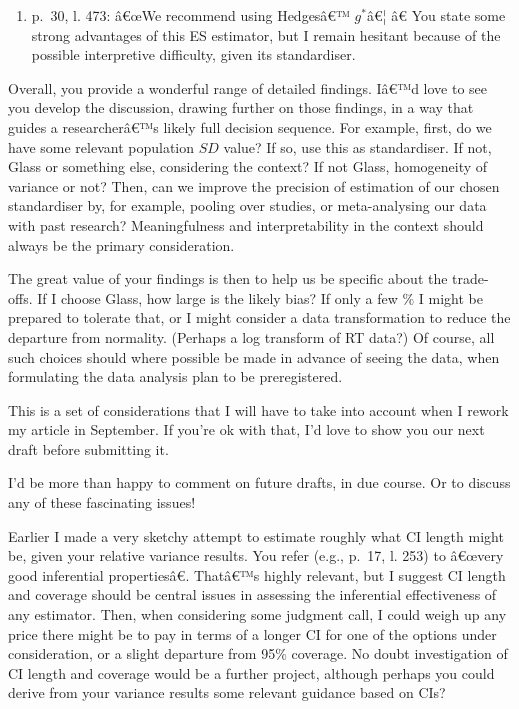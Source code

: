 \begin{appendix}
\color{black}

\begin{enumerate}
\def\labelenumi{\arabic{enumi}.}
\setcounter{enumi}{1}
\tightlist
\item
  p.~30, l. 473: â€œWe recommend using Hedgesâ€™ \(g^*\)â€¦ â€ You
  state some strong advantages of this ES estimator, but I remain
  hesitant because of the possible interpretive difficulty, given its
  standardiser.
\end{enumerate}

Overall, you provide a wonderful range of detailed findings. Iâ€™d love
to see you develop the discussion, drawing further on those findings, in
a way that guides a researcherâ€™s likely full decision sequence. For
example, first, do we have some relevant population \(SD\) value? If so,
use this as standardiser. If not, Glass or something else, considering
the context? If not Glass, homogeneity of variance or not? Then, can we
improve the precision of estimation of our chosen standardiser by, for
example, pooling over studies, or meta-analysing our data with past
research? Meaningfulness and interpretability in the context should
always be the primary consideration.

The great value of your findings is then to help us be specific about
the trade-offs. If I choose Glass, how large is the likely bias? If only
a few \(\%\) I might be prepared to tolerate that, or I might consider a
data transformation to reduce the departure from normality. (Perhaps a
log transform of RT data?) Of course, all such choices should where
possible be made in advance of seeing the data, when formulating the
data analysis plan to be preregistered.

\color{blue} This is a set of considerations that I will have to take
into account when I rework my article in September. If you're ok with
that, I'd love to show you our next draft before submitting it.

\color{brown} I'd be more than happy to comment on future drafts, in due
course. Or to discuss any of these fascinating issues!

\color{black} Earlier I made a very sketchy attempt to estimate roughly
what CI length might be, given your relative variance results. You refer
(e.g., p.~17, l. 253) to â€œvery good inferential propertiesâ€.
Thatâ€™s highly relevant, but I suggest CI length and coverage should be
central issues in assessing the inferential effectiveness of any
estimator. Then, when considering some judgment call, I could weigh up
any price there might be to pay in terms of a longer CI for one of the
options under consideration, or a slight departure from 95\(\%\)
coverage. No doubt investigation of CI length and coverage would be a
further project, although perhaps you could derive from your variance
results some relevant guidance based on CIs?


\end{appendix}
